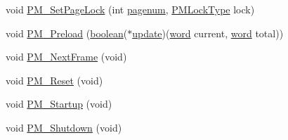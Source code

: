 \begin{DoxyCompactItemize}
\item 
void \hyperlink{ID__PM_8C_a1e7da5d85fc01341f8f9a893ddc87cfc}{PM\_\-SetPageLock} (int \hyperlink{WL__TEXT_8C_ad303d1f16fd753775f930d896512b75b}{pagenum}, \hyperlink{ID__PM_8H_a470960f2645467be319a542ef1f65851}{PMLockType} lock)
\item 
void \hyperlink{ID__PM_8C_ab97049dc4c67f252768239ca432f4204}{PM\_\-Preload} (\hyperlink{ID__HEAD_8H_a7c6368b321bd9acd0149b030bb8275ed}{boolean}($\ast$\hyperlink{WL__PLAY_8C_a377ee66e839b90ae7140bb0dbde6c696}{update})(\hyperlink{ID__HEAD_8H_abad51e07ab6d26bec9f1f786c8d65bcd}{word} current, \hyperlink{ID__HEAD_8H_abad51e07ab6d26bec9f1f786c8d65bcd}{word} total))
\item 
void \hyperlink{ID__PM_8C_a18e14139add000a914aa1c385ad33f34}{PM\_\-NextFrame} (void)
\item 
void \hyperlink{ID__PM_8C_a25eb3f2f08365f6707cb60a298b2366e}{PM\_\-Reset} (void)
\item 
void \hyperlink{ID__PM_8C_a5e5ef876a9184793502a2a5b6884e2d0}{PM\_\-Startup} (void)
\item 
void \hyperlink{ID__PM_8C_a4c8f2bd44f288cb9d7d9c4abe52ffa8c}{PM\_\-Shutdown} (void)
\end{DoxyCompactItemize}
